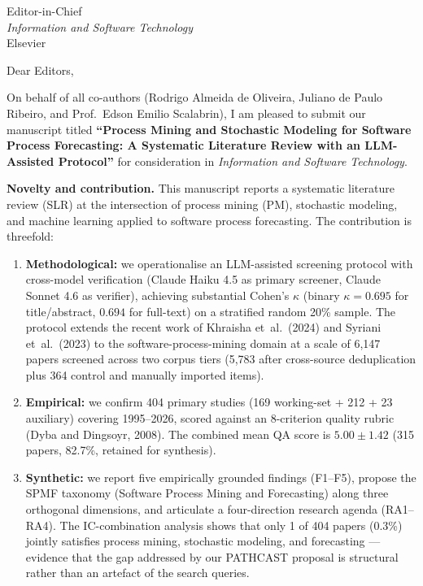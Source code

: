 \documentclass[11pt,a4paper]{letter}
\begin{document}
\begin{letter}{Editor-in-Chief \\ \emph{Information and Software Technology} \\ Elsevier}

\opening{Dear Editors,}

On behalf of all co-authors (Rodrigo Almeida de Oliveira, Juliano de Paulo
Ribeiro, and Prof.\ Edson Emilio Scalabrin), I am pleased to submit our
manuscript titled
\textbf{``Process Mining and Stochastic Modeling for Software Process
Forecasting: A Systematic Literature Review with an LLM-Assisted Protocol''}
for consideration in \emph{Information and Software Technology}.

\medskip\noindent\textbf{Novelty and contribution.}
This manuscript reports a systematic literature review (SLR) at the
intersection of process mining (PM), stochastic modeling, and machine
learning applied to software process forecasting. The contribution is
threefold:
\begin{enumerate}
\item \textbf{Methodological:} we operationalise an LLM-assisted screening
      protocol with cross-model verification (Claude Haiku 4.5 as primary
      screener, Claude Sonnet 4.6 as verifier), achieving substantial
      Cohen's $\kappa$ (binary $\kappa = 0.695$ for title/abstract,
      $0.694$ for full-text) on a stratified random 20\% sample. The
      protocol extends the recent work of Khraisha et~al.~(2024) and
      Syriani et~al.~(2023) to the software-process-mining domain at a
      scale of 6{,}147 papers screened across two corpus tiers (5{,}783
      after cross-source deduplication plus 364 control and manually
      imported items).
\item \textbf{Empirical:} we confirm 404 primary studies (169 working-set
      + 212 + 23 auxiliary) covering 1995--2026, scored against an
      8-criterion quality rubric (Dyba and Dingsoyr, 2008). The combined
      mean QA score is $5.00 \pm 1.42$ (315 papers, 82.7\%, retained for
      synthesis).
\item \textbf{Synthetic:} we report five empirically grounded findings
      (F1--F5), propose the SPMF taxonomy (Software Process Mining and
      Forecasting) along three orthogonal dimensions, and articulate a
      four-direction research agenda (RA1--RA4). The IC-combination
      analysis shows that only 1 of 404 papers (0.3\%) jointly satisfies
      process mining, stochastic modeling, and forecasting --- evidence
      that the gap addressed by our PATHCAST proposal is structural
      rather than an artefact of the search queries.
\end{enumerate}


\end{letter}
\end{document}
